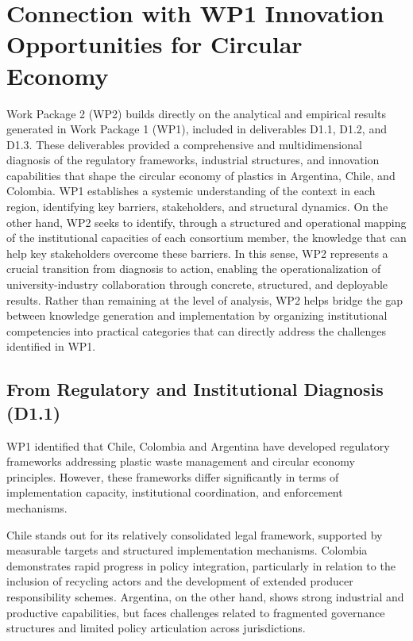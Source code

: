 \documentclass[
  12pt,
  oneside]{book}
\begin{document}
\chapter{Connection with WP1 Innovation Opportunities for Circular
Economy}\label{connection-with-wp1-innovation-opportunities-for-circular-economy}

Work Package 2 (WP2) builds directly on the analytical and empirical
results generated in Work Package 1 (WP1), included in deliverables
D1.1, D1.2, and D1.3. These deliverables provided a comprehensive and
multidimensional diagnosis of the regulatory frameworks, industrial
structures, and innovation capabilities that shape the circular economy
of plastics in Argentina, Chile, and Colombia. WP1 establishes a
systemic understanding of the context in each region, identifying key
barriers, stakeholders, and structural dynamics. On the other hand, WP2
seeks to identify, through a structured and operational mapping of the
institutional capacities of each consortium member, the knowledge that
can help key stakeholders overcome these barriers. In this sense, WP2
represents a crucial transition from diagnosis to action, enabling the
operationalization of university-industry collaboration through
concrete, structured, and deployable results. Rather than remaining at
the level of analysis, WP2 helps bridge the gap between knowledge
generation and implementation by organizing institutional competencies
into practical categories that can directly address the challenges
identified in WP1.

\section{From Regulatory and Institutional Diagnosis
(D1.1)}\label{from-regulatory-and-institutional-diagnosis-d1.1}

WP1 identified that Chile, Colombia and Argentina have developed
regulatory frameworks addressing plastic waste management and circular
economy principles. However, these frameworks differ significantly in
terms of implementation capacity, institutional coordination, and
enforcement mechanisms.

Chile stands out for its relatively consolidated legal framework,
supported by measurable targets and structured implementation
mechanisms. Colombia demonstrates rapid progress in policy integration,
particularly in relation to the inclusion of recycling actors and the
development of extended producer responsibility schemes. Argentina, on
the other hand, shows strong industrial and productive capabilities, but
faces challenges related to fragmented governance structures and limited
policy articulation across jurisdictions.
\end{document}
